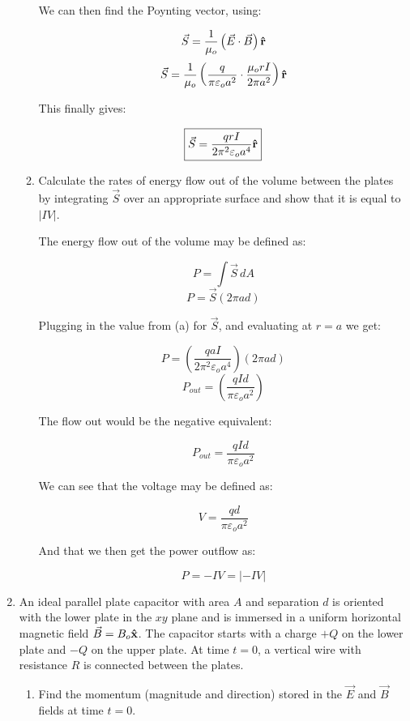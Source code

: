 \begin{enumerate}
\begin{enumerate}
        We can then find the Poynting vector, using:

        $$\vec{S}=\frac{1}{\mu_o}\left( \vec{E}\cdot\vec{B} \right)\bold{\hat{r}}$$
        $$\vec{S}=\frac{1}{\mu_o}\left( \frac{q}{\pi\varepsilon_o a^2}\cdot\frac{\mu_orI}{2\pi a^2} \right)\bold{\hat{r}}$$

        This finally gives:

        $$\boxed{\vec{S}=\frac{qrI}{2\pi^2\varepsilon_o a^4}\bold{\hat{r}}}$$

      \item Calculate the rates of energy flow out of the volume between the plates by integrating $\vec{S}$ over an appropriate surface and show that it is equal to $|IV|$.

        The energy flow out of the volume may be defined as:

        $$P=\int \vec{S}\,dA$$
        $$P=\vec{S}(2\pi a d)$$

        Plugging in the value from (a) for $\vec{S}$, and evaluating at $r=a$ we get:

        $$P=\left( \frac{qaI}{2\pi^2\varepsilon_o a^4} \right)\left( 2\pi ad \right)$$
        $$P_{out}=\left( \frac{qId}{\pi\varepsilon_o a^2} \right)$$

        The flow out would be the negative equivalent:

        $$\boxed{P_{out}=\frac{qId}{\pi\varepsilon_o a^2}}$$

        We can see that the voltage may be defined as:

        $$V=\frac{qd}{\pi\varepsilon_o a^2}$$

        And that we then get the power outflow as:

        $$P=-IV=|-IV|$$

    \end{enumerate}

  \item An ideal parallel plate capacitor with area $A$ and separation $d$ is oriented with the lower plate in the $xy$ plane and is immersed in a uniform horizontal magnetic field $\vec{B}=B_o\bold{\hat{x}}$. The capacitor starts with a charge $+Q$ on the lower plate and $-Q$ on the upper plate. At time $t=0$, a vertical wire with resistance $R$ is connected between the plates.

    \begin{enumerate}

      \item Find the momentum (magnitude and direction) stored in the $\vec{E}$ and $\vec{B}$ fields at time $t=0$.


\end{enumerate}
\end{enumerate}
